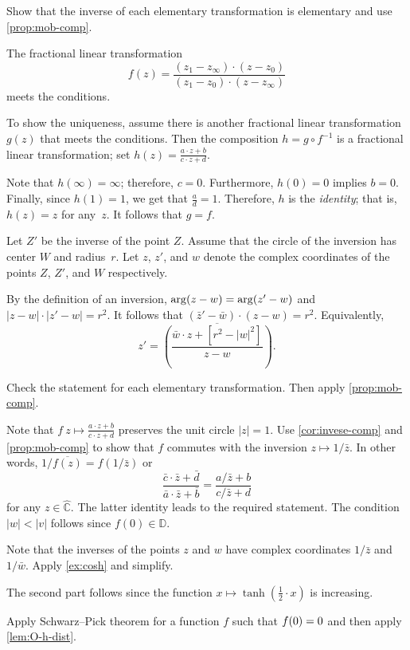 Show that the inverse of each elementary transformation is elementary
and use \ref{prop:mob-comp}.

The fractional linear transformation
\[f(z)=\frac{(z_1-z_\infty)\cdot(z-z_0)}{(z_1-z_0)\cdot(z-z_\infty)}\]
meets the conditions.

To show the uniqueness, assume there is another fractional linear transformation
$g(z)$ that meets the conditions.
Then the composition
$h=g\circ f^{-1}$ 
is a fractional linear transformation; set
$h(z)=\tfrac{a\cdot z+b}{c\cdot z+d}$.

Note that $h(\infty)=\infty$;
therefore, $c=0$.
Furthermore, $h(0)=0$ implies $b=0$.
Finally, since $h(1)=1$, we get that $\tfrac ad=1$.
Therefore, $h$ is the \emph{identity};
that is, $h(z)=z$ for any~$z$.
It follows that $g=f$.

Let $Z'$ be the inverse of the point $Z$.
Assume that the circle of the inversion has center $W$ and radius~$r$.
Let $z$, $z'$, and $w$ denote the complex coordinates of the points $Z$, $Z'$, and $W$ respectively.

By the definition of an inversion, $\arg (z-w)=\arg (z'-w)$ and
$|z-w|\cdot|z'-w|=r^2$.
It follows that $(\bar z'-\bar w)\cdot ( z- w)= r^2$.
Equivalently,
\[z'=\overline{\left(\frac{\bar w\cdot z+[r^2-|w|^2]}{z- w}\right)}.\]

 
Check the statement for each elementary transformation.
Then apply \ref{prop:mob-comp}.

Note that $f\:z\mapsto\tfrac{a\cdot z+b}{c\cdot z+d}$ preserves the unit circle $|z|=1$.
Use \ref{cor:invese-comp} and \ref{prop:mob-comp} to show that $f$ commutes with the inversion $z\mapsto 1/\bar z$.
In other words, $1/\overline{f(z)}=f(1/\bar z)$ or
\[\frac{\bar c\cdot \bar z+\bar d}{\bar a\cdot \bar z+\bar b}
=\frac{a/\bar z+b}{c/\bar z+d}\]
for any $z\in\hat{\mathbb{C}}$.
The latter identity leads to the required statement. 
The condition $|w|<|v|$ follows since $f(0)\in\mathbb{D}$.

Note that the inverses of the points $z$ and $w$ have complex coordinates $1/\bar z$ and $1/\bar w$.
Apply \ref{ex:cosh} and simplify.

The second part follows since the function $x\mapsto \tanh(\tfrac12\cdot x)$ is increasing.

Apply Schwarz--Pick theorem for a function $f$ such that $f(0)=0$ and then apply \ref{lem:O-h-dist}.

